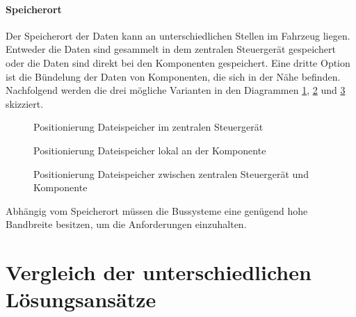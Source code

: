 \paragraph{Speicherort}
Der Speicherort der Daten kann an unterschiedlichen Stellen im Fahrzeug liegen. Entweder die Daten sind gesammelt in dem zentralen Steuergerät gespeichert oder die Daten sind direkt bei den Komponenten gespeichert. Eine dritte Option ist die Bündelung der Daten von Komponenten, die sich in der Nähe befinden.
Nachfolgend werden die drei mögliche Varianten in den Diagrammen \ref{fig:architektur1}, \ref{fig:architektur2}  und \ref{fig:architektur3} skizziert.
\begin{figure}[hbt]
	\centering
	
	\caption[Positionierung Dateispeicher im zentralen Steuergerät]{Positionierung Dateispeicher im zentralen Steuergerät}
	\label{fig:architektur1}
\end{figure}
\begin{figure}[hbt]
	\centering
	
	\caption[Positionierung Dateispeicher lokal an der Komponente]{Positionierung Dateispeicher lokal an der Komponente}
	\label{fig:architektur2}
\end{figure}
\begin{figure}[hbt]
	\centering
	
	\caption[Positionierung Dateispeicher zwischen zentralen Steuergerät und Komponente]{Positionierung Dateispeicher zwischen zentralen Steuergerät und Komponente}
	\label{fig:architektur3}
\end{figure}
Abhängig vom Speicherort müssen die Bussysteme eine genügend hohe Bandbreite besitzen, um die Anforderungen einzuhalten. 

\section{Vergleich der unterschiedlichen Lösungsansätze}